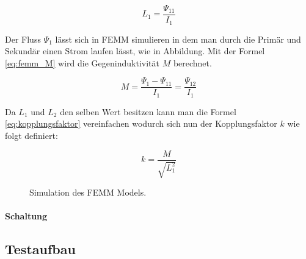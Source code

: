 \begin{equation}
L_{1}=\frac{\Psi_{11}}{I_{1}}
\label{eq:femm_l1}
\end{equation}

Der Fluss $ \Psi_{1} $ lässt sich in FEMM simulieren in dem man durch die Primär und Sekundär einen Strom laufen lässt, wie in Abbildung. Mit der Formel \ref{eq:femm_M} wird die Gegeninduktivität $ M $ berechnet.

\begin{equation}
M=\frac{\Psi_{1}-\Psi_{11}}{I_{1}}=\frac{\Psi_{12}}{I_{1}}
\label{eq:femm_M}
\end{equation}

Da $ L_{1} $ und $ L_{2} $ den selben Wert besitzen kann man die Formel \ref{eq:kopplungsfaktor} vereinfachen wodurch sich nun der Kopplungsfaktor $ k $ wie folgt definiert:

\begin{equation}
k=\frac{M}{\sqrt{L_{1}^{2}}}
\label{eq:kopplungsfaktor_neu}
\end{equation}



\begin{figure}[h]
	\centering
	\qquad
	\caption{Simulation des FEMM Models.}
	\label{fig:Subfigure}
\end{figure}

\paragraph{Schaltung}

\subsection{Testaufbau}

